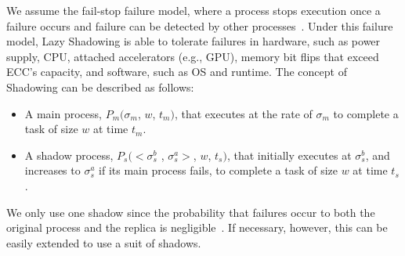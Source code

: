 We assume the
fail-stop failure model, where a process stops execution once a failure
occurs and failure can be detected by other
processes~\cite{gartner_faults_1999,cristian_comm_1991}.
Under this failure model, Lazy Shadowing is able to tolerate failures in hardware, such as power supply, CPU, attached accelerators (e.g., GPU), memory bit flips that exceed ECC's capacity, and software, such as OS and runtime. 
The concept of Shadowing can be described as follows:
\begin{itemize}
	\item A main process, $P_m(\sigma_m$, $w$, $t_m)$, that executes at the rate of $\sigma_m$ to complete a task of size $w$ at time $t_m$.
	\item A shadow process, $P_s(<\sigma_s^b$ , $\sigma_s^a>$, $w$, $t_s)$, that initially executes at $\sigma_s^b$, and increases to $\sigma_s^a$ if its main process fails, to complete a task of size $w$ at time $t_s$.%
\end{itemize}
We only use one shadow since the probability that failures occur to both the original process and the replica is negligible~\cite{casanova_inria_2012}. 
If necessary, however, this can be easily extended to use a suit of shadows. 



